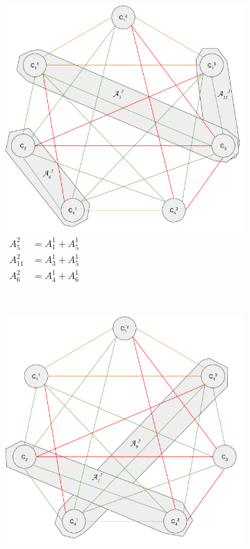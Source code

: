 \begin{figure}[h]
\begin{subfigure}[b]{\sfwidth}
    \includegraphics[width=\textwidth]{img/split-2-class_3.png}
    \caption[caption]{$\begin{aligned}
              A_5^2    &= A_1^1 + A_5^1\\
              A_{11}^2 &= A_3^1 + A_5^1\\
              A_6^2    &= A_4^1 + A_6^1
             \end{aligned}$}
  \end{subfigure}
\\
  \begin{subfigure}[b]{\sfwidth}
    \includegraphics[width=\textwidth]{img/split-2-class_4.png}

\end{subfigure}
\end{figure}
